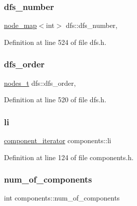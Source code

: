 \subsubsection{\texorpdfstring{dfs\+\_\+number}{dfs\_number}}
{\footnotesize\ttfamily \mbox{\hyperlink{classnode__map}{node\+\_\+map}}$<$int$>$ dfs\+::dfs\+\_\+number\hspace{0.3cm}{\ttfamily [protected]}, {\ttfamily [inherited]}}



Definition at line 524 of file dfs.\+h.

\mbox{\label{classdfs_af70a73ace68afd91ef944f984c9f28d5}} 
\subsubsection{\texorpdfstring{dfs\+\_\+order}{dfs\_order}}
{\footnotesize\ttfamily \mbox{\hyperlink{edge_8h_a22ac17689106ba21a84e7bc54d1199d6}{nodes\+\_\+t}} dfs\+::dfs\+\_\+order\hspace{0.3cm}{\ttfamily [protected]}, {\ttfamily [inherited]}}



Definition at line 520 of file dfs.\+h.

\mbox{\label{classcomponents_ae88ffb062b1ea4931ecfaa53e871825f}} 
\subsubsection{\texorpdfstring{li}{li}}
{\footnotesize\ttfamily \mbox{\hyperlink{classcomponents_a0954ef13f83f3c1ac6cd4474cac17a36}{component\+\_\+iterator}} components\+::li\hspace{0.3cm}{\ttfamily [protected]}}



Definition at line 124 of file components.\+h.

\mbox{\label{classcomponents_ad5a54d7313e23f8c6a2c6347e6ee70a0}} 
\subsubsection{\texorpdfstring{num\+\_\+of\+\_\+components}{num\_of\_components}}
{\footnotesize\ttfamily int components\+::num\+\_\+of\+\_\+components\hspace{0.3cm}{\ttfamily [protected]}}



